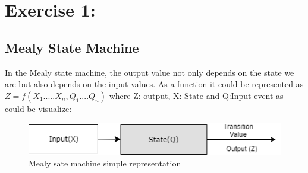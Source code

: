 



%
%
%

\section{\color{olive}Exercise 1: }

\subsection{\color{purple}Mealy State Machine}

In the Mealy state machine, the output value not only depends on the state we are but also depends on the input values. As a function it could be represented as $Z=f(X_1.....X_n,Q_1....Q_n)$ where Z: output, X: State and Q:Input event as could be visualize:

 \begin{figure}[h!]
        \centering
        \includegraphics[scale=0.75]{Mealydiagram.png}
        \caption{\color{cyan}Mealy sate machine simple representation}
        \label{fig:ej1mealyd}
    \end{figure}






















